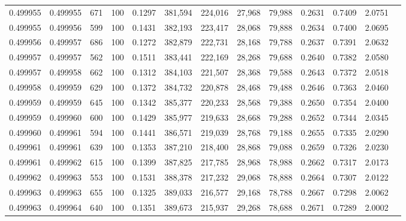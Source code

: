 \begin{tabular}{rrrrrrrrrrrrr}
0.499955 & 0.499955 &   671 & 100 &                                     0.1297 & 381,594 & 224,016 &  27,968 &  79,988 & 0.2631 & 0.7409 & 2.0751 \\
0.499955 & 0.499956 &   599 & 100 &                                     0.1431 & 382,193 & 223,417 &  28,068 &  79,888 & 0.2634 & 0.7400 & 2.0695 \\
0.499956 & 0.499957 &   686 & 100 &                                     0.1272 & 382,879 & 222,731 &  28,168 &  79,788 & 0.2637 & 0.7391 & 2.0632 \\
0.499957 & 0.499957 &   562 & 100 &                                     0.1511 & 383,441 & 222,169 &  28,268 &  79,688 & 0.2640 & 0.7382 & 2.0580 \\
0.499957 & 0.499958 &   662 & 100 &                                     0.1312 & 384,103 & 221,507 &  28,368 &  79,588 & 0.2643 & 0.7372 & 2.0518 \\
0.499958 & 0.499959 &   629 & 100 &                                     0.1372 & 384,732 & 220,878 &  28,468 &  79,488 & 0.2646 & 0.7363 & 2.0460 \\
0.499959 & 0.499959 &   645 & 100 &                                     0.1342 & 385,377 & 220,233 &  28,568 &  79,388 & 0.2650 & 0.7354 & 2.0400 \\
0.499959 & 0.499960 &   600 & 100 &                                     0.1429 & 385,977 & 219,633 &  28,668 &  79,288 & 0.2652 & 0.7344 & 2.0345 \\
0.499960 & 0.499961 &   594 & 100 &                                     0.1441 & 386,571 & 219,039 &  28,768 &  79,188 & 0.2655 & 0.7335 & 2.0290 \\
0.499961 & 0.499961 &   639 & 100 &                                     0.1353 & 387,210 & 218,400 &  28,868 &  79,088 & 0.2659 & 0.7326 & 2.0230 \\
0.499961 & 0.499962 &   615 & 100 &                                     0.1399 & 387,825 & 217,785 &  28,968 &  78,988 & 0.2662 & 0.7317 & 2.0173 \\
0.499962 & 0.499963 &   553 & 100 &                                     0.1531 & 388,378 & 217,232 &  29,068 &  78,888 & 0.2664 & 0.7307 & 2.0122 \\
0.499963 & 0.499963 &   655 & 100 &                                     0.1325 & 389,033 & 216,577 &  29,168 &  78,788 & 0.2667 & 0.7298 & 2.0062 \\
0.499963 & 0.499964 &   640 & 100 &                                     0.1351 & 389,673 & 215,937 &  29,268 &  78,688 & 0.2671 & 0.7289 & 2.0002 \\

\end{tabular}

